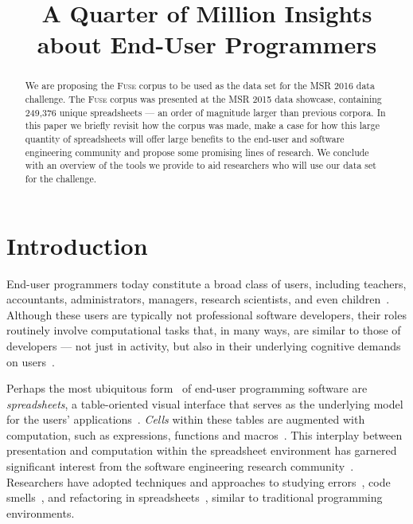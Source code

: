 \documentclass[conference]{IEEEtran}
\newcommand{\xlscount}{249,376}
\begin{document}
\title{A Quarter of Million Insights about End-User Programmers}

\author{
}


\maketitle

\begin{abstract}
We are proposing the \textsc{Fuse} corpus to be used as the data set for the MSR 2016 data challenge.
The \textsc{Fuse} corpus was presented at the MSR 2015 data showcase, containing \xlscount{} unique spreadsheets --- an order of magnitude larger than previous corpora.
In this paper we briefly revisit how the corpus was made, make a case for how this large quantity of spreadsheets will offer large benefits to the end-user and software engineering community and propose some promising lines of research.
We conclude with an overview of the tools we provide to aid researchers who will use our data set for the challenge.

\end{abstract}


\IEEEpeerreviewmaketitle

\section{Introduction}

End-user programmers today constitute a broad class of users, including teachers, accountants, administrators, managers, research scientists, and even children~\cite{Ko2011}.
%
Although these users are typically not professional software developers, their roles routinely involve computational tasks that, in many ways, are similar to those of developers --- not just in activity, but also in their underlying cognitive demands on users~\cite{Blackwell2002}. 

Perhaps the most ubiquitous form~\cite{Scaffidi2005} of end-user programming software are \emph{spreadsheets}, a table-oriented visual interface that serves as the underlying model for the users' applications~\cite{Nardi1990}. \emph{Cells} within these tables are augmented with computation, such as expressions, functions and macros~\cite{Nardi1990}. 
This interplay between presentation and computation within the spreadsheet environment has garnered significant interest from the software engineering research community~\cite{Burnett2009}. 
Researchers have adopted techniques and approaches to studying errors~\cite{Powell2008}, code smells~\cite{Pinzger2012}, and refactoring in spreadsheets~\cite{Badame2012}, similar to traditional programming environments. 
\end{document}
